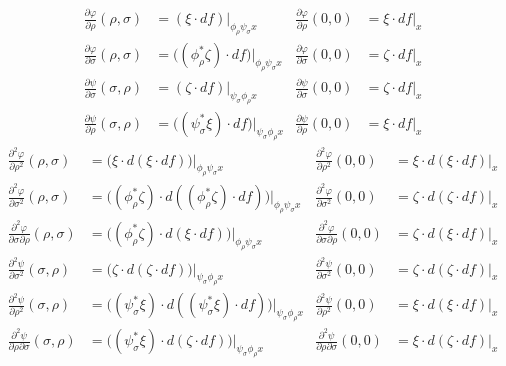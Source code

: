 \begin{align*}
  \frac{\partial\varphi}{\partial\rho}(\rho,\sigma) &= (\xi\cdot df)\big|_{\phi_\rho\psi_\sigma x}
    & \frac{\partial\varphi}{\partial\rho}(0,0) &= \xi\cdot df\big|_x \\
  \frac{\partial\varphi}{\partial\sigma}(\rho,\sigma) &= \big((\phi_\rho^*\zeta)\cdot df\big)\big|_{\phi_\rho\psi_\sigma x}
    & \frac{\partial\varphi}{\partial\sigma}(0,0) &= \zeta\cdot df\big|_x \\
  \frac{\partial\psi}{\partial\sigma}(\sigma,\rho) &= (\zeta\cdot df)\big|_{\psi_\sigma\phi_\rho x}
    & \frac{\partial\psi}{\partial\sigma}(0,0) &= \zeta\cdot df\big|_x \\
  \frac{\partial\psi}{\partial\rho}(\sigma,\rho) &= \big((\psi_\sigma^*\xi)\cdot df\big)\big|_{\psi_\sigma\phi_\rho x}
    & \frac{\partial\psi}{\partial\rho}(0,0) &= \xi\cdot df\big|_x
\end{align*}
\begin{align*}
  \frac{\partial^2\varphi}{\partial\rho^2}(\rho,\sigma) &= \big(\xi\cdot d(\xi\cdot df)\big)\big|_{\phi_\rho\psi_\sigma x}
    & \frac{\partial^2\varphi}{\partial\rho^2}(0,0) &= \xi\cdot d(\xi\cdot df)\big|_x \\
  \frac{\partial^2\varphi}{\partial\sigma^2}(\rho,\sigma) &= \big((\phi_\rho^*\zeta)\cdot d((\phi_\rho^*\zeta)\cdot df)\big)\big|_{\phi_\rho\psi_\sigma x}
    & \frac{\partial^2\varphi}{\partial\sigma^2}(0,0) &= \zeta\cdot d(\zeta\cdot df)\big|_x \\
  \frac{\partial^2\varphi}{\partial\sigma\partial\rho}(\rho,\sigma) &= \big((\phi_\rho^*\zeta)\cdot d(\xi\cdot df)\big)\big|_{\phi_\rho\psi_\sigma x}
    & \frac{\partial^2\varphi}{\partial\sigma\partial\rho}(0,0) &= \zeta\cdot d(\xi\cdot df)\big|_x \\
  \frac{\partial^2\psi}{\partial\sigma^2}(\sigma,\rho) &= \big(\zeta\cdot d(\zeta\cdot df)\big)\big|_{\psi_\sigma\phi_\rho x}
    & \frac{\partial^2\psi}{\partial\sigma^2}(0,0) &= \zeta\cdot d(\zeta\cdot df)\big|_x \\
  \frac{\partial^2\psi}{\partial\rho^2}(\sigma,\rho) &= \big((\psi_\sigma^*\xi)\cdot d((\psi_\sigma^*\xi)\cdot df)\big)\big|_{\psi_\sigma\phi_\rho x}
    & \frac{\partial^2\psi}{\partial\rho^2}(0,0) &= \xi\cdot d(\xi\cdot df)\big|_x \\
  \frac{\partial^2\psi}{\partial\rho\partial\sigma}(\sigma,\rho) &= \big((\psi_\sigma^*\xi)\cdot d(\zeta\cdot df)\big)\big|_{\psi_\sigma\phi_\rho x}
    & \frac{\partial^2\psi}{\partial\rho\partial\sigma}(0,0) &= \xi\cdot d(\zeta\cdot df)\big|_x
\end{align*}
